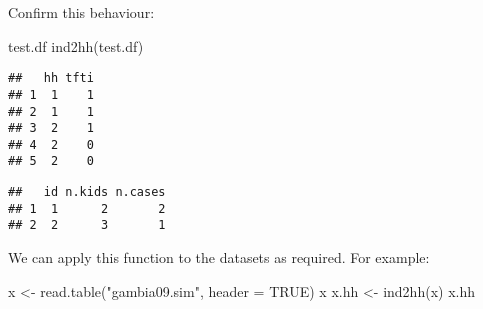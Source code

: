 \documentclass[
  12pt,
  a4paper]{book}
\newenvironment{Shaded}{\begin{snugshade}}{\end{snugshade}}
\newcommand{\AttributeTok}[1]{\textcolor[rgb]{0.77,0.63,0.00}{#1}}
\newcommand{\ConstantTok}[1]{\textcolor[rgb]{0.00,0.00,0.00}{#1}}
\newcommand{\FunctionTok}[1]{\textcolor[rgb]{0.00,0.00,0.00}{#1}}
\newcommand{\NormalTok}[1]{#1}
\newcommand{\OtherTok}[1]{\textcolor[rgb]{0.56,0.35,0.01}{#1}}
\newcommand{\StringTok}[1]{\textcolor[rgb]{0.31,0.60,0.02}{#1}}
\begin{document}
Confirm this behaviour:

\begin{Shaded}
\begin{Highlighting}[]
\NormalTok{test.df}
\FunctionTok{ind2hh}\NormalTok{(test.df)}
\end{Highlighting}
\end{Shaded}

\begin{verbatim}
##   hh tfti
## 1  1    1
## 2  1    1
## 3  2    1
## 4  2    0
## 5  2    0
\end{verbatim}

\begin{verbatim}
##   id n.kids n.cases
## 1  1      2       2
## 2  2      3       1
\end{verbatim}

We can apply this function to the datasets as required. For example:

\begin{Shaded}
\begin{Highlighting}[]
\NormalTok{x }\OtherTok{\textless{}{-}} \FunctionTok{read.table}\NormalTok{(}\StringTok{"gambia09.sim"}\NormalTok{, }\AttributeTok{header =} \ConstantTok{TRUE}\NormalTok{)}
\NormalTok{x}
\NormalTok{x.hh }\OtherTok{\textless{}{-}} \FunctionTok{ind2hh}\NormalTok{(x)}
\NormalTok{x.hh}
\end{Highlighting}
\end{Shaded}
\end{document}
